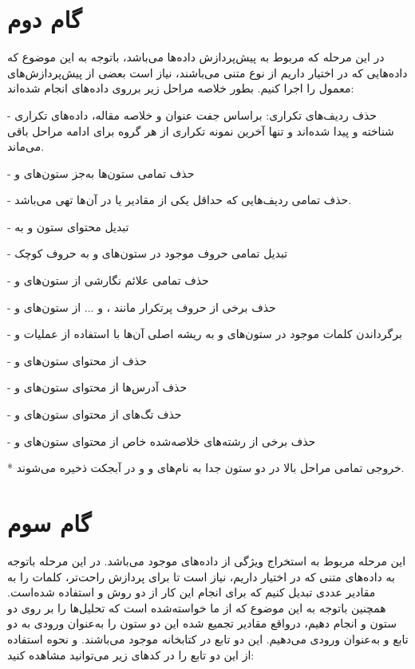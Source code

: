 \documentclass{article}
\begin{document}
\newpage
\section{گام دوم}
در این مرحله که مربوط به پیش‌پردازش داده‌ها می‌باشد، باتوجه به این موضوع که داده‌هایی که در اختیار داریم از نوع متنی می‌باشند، نیاز است بعضی از پیش‌پردازش‌های معمول را اجرا کنیم. بطور خلاصه مراحل زیر برروی داده‌های انجام شده‌اند:

- حذف ردیف‌های تکراری: براساس جفت عنوان و خلاصه مقاله، داده‌های تکراری شناخته و پیدا شده‌اند و تنها آخرین نمونه تکراری از هر گروه برای ادامه مراحل باقی می‌ماند.

- حذف تمامی ستون‌ها به‌جز ستون‌های  و 

- حذف تمامی ردیف‌هایی که حداقل یکی از مقادیر  یا  در آن‌ها تهی می‌باشد.

- تبدیل محتوای ستون  و  به 

- تبدیل تمامی حروف موجود در ستون‌های  و  به حروف کوچک

- حذف تمامی علائم نگارشی از ستون‌های  و 

- حذف برخی از حروف پرتکرار مانند ،  و ... از ستون‌های  و 

- برگرداندن کلمات موجود در ستون‌های  و  به ریشه اصلی آن‌ها با استفاده از عملیات  و 

- حذف  از محتوای ستون‌های  و 

- حذف آدرس‌ها از محتوای ستون‌های  و 

- حذف تگ‌های  از محتوای ستون‌های  و 

- حذف برخی از رشته‌های خلاصه‌شده خاص از محتوای ستون‌های  و 

* خروجی تمامی مراحل بالا در دو ستون جدا به‌ نام‌های  و  و در آبجکت  ذخیره می‌شوند.

\newpage
\section{گام سوم}
این مرحله مربوط به استخراج ویژگی از داده‌های موجود می‌باشد. در این مرحله باتوجه به داده‌های متنی که در اختیار داریم، نیاز است تا برای پردازش راحت‌تر، کلمات را به مقادیر عددی تبدیل کنیم که برای انجام این کار از دو روش  و  استفاده شده‌است.
همچنین باتوجه به این موضوع که از ما خواسته‌شده است که تحلیل‌ها را بر روی دو ستون  و  انجام دهیم، درواقع مقادیر تجمیع شده این دو ستون را به‌عنوان ورودی به دو تابع  و  به‌عنوان ورودی می‌دهیم. این دو تابع در کتابخانه  موجود می‌باشند. و نحوه استفاده از این دو تابع را در کدهای زیر می‌توانید مشاهده کنید:
\end{document}
